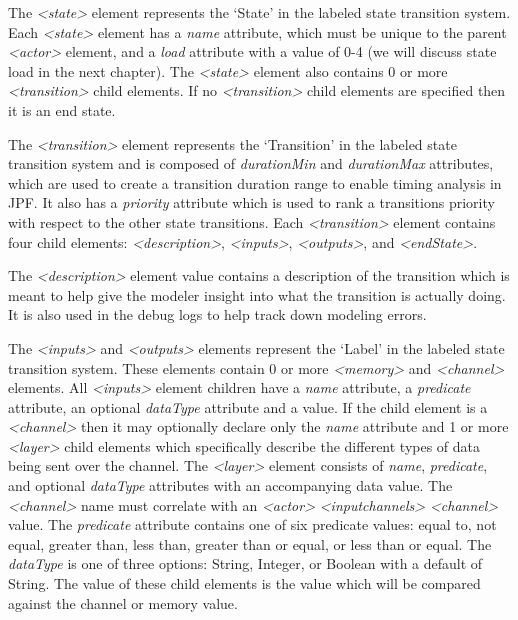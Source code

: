 The {\em \textless state\textgreater} element represents the `State' in the labeled state transition system.  Each {\em \textless state\textgreater} element has a {\em name} attribute, which must be unique to the parent {\em \textless actor\textgreater} element, and a {\em load} attribute with a value of 0-4 (we will discuss state load in the next chapter).  The {\em \textless state\textgreater} element also contains 0 or more {\em \textless transition\textgreater} child elements.  If no {\em \textless transition\textgreater} child elements are specified then it is an end state.  

The {\em \textless transition\textgreater} element represents the `Transition' in the labeled state transition system and is composed of {\em durationMin} and {\em durationMax} attributes, which are used to create a transition duration range to enable timing analysis in JPF.  It also has a {\em priority} attribute which is used to rank a transitions priority with respect to the other state transitions.  Each {\em \textless transition\textgreater} element contains four child elements: {\em \textless description\textgreater}, {\em \textless inputs\textgreater}, {\em \textless outputs\textgreater}, and {\em \textless endState\textgreater}.  

The {\em \textless description\textgreater} element value contains a description of the transition which is meant to help give the modeler insight into what the transition is actually doing.  It is also used in the debug logs to help track down modeling errors.  

The {\em \textless inputs\textgreater} and {\em \textless outputs\textgreater} elements represent the `Label' in the labeled state transition system.  These elements contain 0 or more {\em \textless memory\textgreater} and {\em \textless channel\textgreater} elements.  All {\em \textless inputs\textgreater} element children have a {\em name} attribute, a {\em predicate} attribute, an optional {\em dataType} attribute and a value.  If the child element is a {\em \textless channel\textgreater} then it may optionally declare only the {\em name} attribute and 1 or more {\em \textless layer\textgreater} child elements which specifically describe the different types of data being sent over the channel.  The {\em \textless layer\textgreater} element consists of {\em name}, {\em predicate}, and optional {\em dataType} attributes with an accompanying data value.  The {\em \textless channel\textgreater} name must correlate with an {\em \textless actor\textgreater} {\em \textless inputchannels\textgreater} {\em \textless channel\textgreater} value.  The {\em predicate} attribute contains one of six predicate values: equal to, not equal, greater than, less than, greater than or equal, or less than or equal.  The {\em dataType} is one of three options: String, Integer, or Boolean with a default of String.  The value of these child elements is the value which will be compared against the channel or memory value.  

